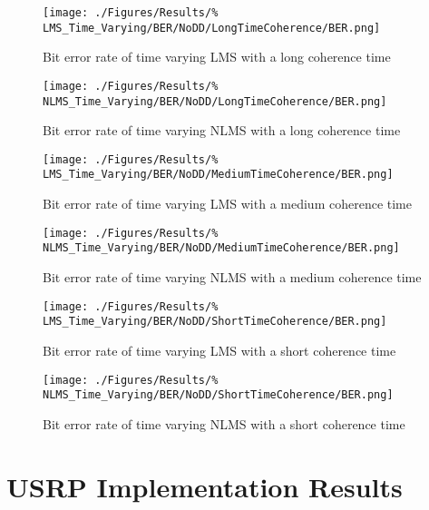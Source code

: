 \begin{figure}[ht]
	\centering
	\begin{minipage}{0.49\textwidth}
		\centering
		\texttt{[image: ./Figures/Results/\%
	LMS\_Time\_Varying/BER/NoDD/LongTimeCoherence/BER.png]}
		\caption{Bit error rate of time varying LMS with a 
		long coherence time}
	\end{minipage}
	\begin{minipage}{0.49\textwidth}
		\centering
		\texttt{[image: ./Figures/Results/\%
	NLMS\_Time\_Varying/BER/NoDD/LongTimeCoherence/BER.png]}
		\caption{Bit error rate of time varying NLMS with a 
		long coherence time}
	\end{minipage}
\end{figure}

\begin{figure}[ht]
	\centering
	\begin{minipage}{0.49\textwidth}
		\centering
		\texttt{[image: ./Figures/Results/\%
	LMS\_Time\_Varying/BER/NoDD/MediumTimeCoherence/BER.png]}
		\caption{Bit error rate of time varying LMS with a 
		medium coherence time}
	\end{minipage}
	\begin{minipage}{0.49\textwidth}
		\centering
		\texttt{[image: ./Figures/Results/\%
	NLMS\_Time\_Varying/BER/NoDD/MediumTimeCoherence/BER.png]}
		\caption{Bit error rate of time varying NLMS with a 
		medium coherence time}
	\end{minipage}
\end{figure}

\begin{figure}[ht]
	\centering
	\begin{minipage}{0.49\textwidth}
		\centering
		\texttt{[image: ./Figures/Results/\%
	LMS\_Time\_Varying/BER/NoDD/ShortTimeCoherence/BER.png]}
		\caption{Bit error rate of time varying LMS with a 
		short coherence time}
	\end{minipage}
	\begin{minipage}{0.49\textwidth}
		\centering
		\texttt{[image: ./Figures/Results/\%
	NLMS\_Time\_Varying/BER/NoDD/ShortTimeCoherence/BER.png]}
		\caption{Bit error rate of time varying NLMS with a 
		short coherence time}
	\end{minipage}
\end{figure}

\section{USRP Implementation Results}
\label{sec:USRPResults}
\FloatBarrier

